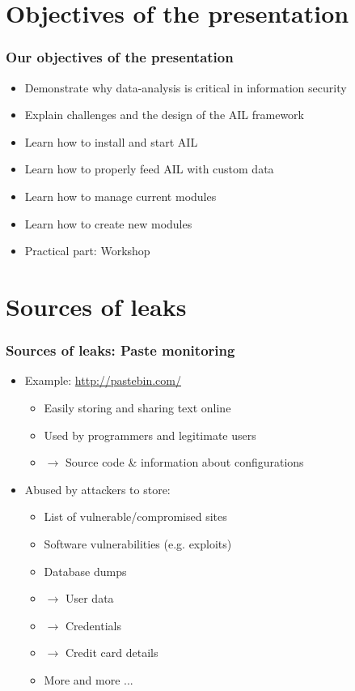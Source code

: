 
\begin{frame}[t,plain]
\titlepage
\end{frame}

\section{Objectives of the presentation}
\begin{frame}
\frametitle{Our objectives of the presentation}
    \begin{itemize}
        \item Demonstrate why data-analysis is critical in information security
        \item Explain challenges and the design of the AIL framework
        \item Learn how to install and start AIL
        \item Learn how to properly feed AIL with custom data
        \item Learn how to manage current modules
        \item Learn how to create new modules
        \item Practical part: Workshop
    \end{itemize}
\end{frame}

\section{Sources of leaks}
\begin{frame}
    \frametitle{Sources of leaks: Paste monitoring}
    \begin{itemize}
        \item Example: \url{http://pastebin.com/}
            \begin{itemize}
                \item Easily storing and sharing text online
                \item Used by programmers and legitimate users
                \item[] $\to$ Source code \& information about configurations
            \end{itemize}
            \pause
        \item Abused by attackers to store:
            \begin{itemize}
                \item List of vulnerable/compromised sites
                \item Software vulnerabilities (e.g. exploits)
                \item Database dumps
                \item[] $\to$ User data
                \item[] $\to$ Credentials
                \item[] $\to$ Credit card details
                \item More and more ...
            \end{itemize}
    \end{itemize}
\end{frame}

